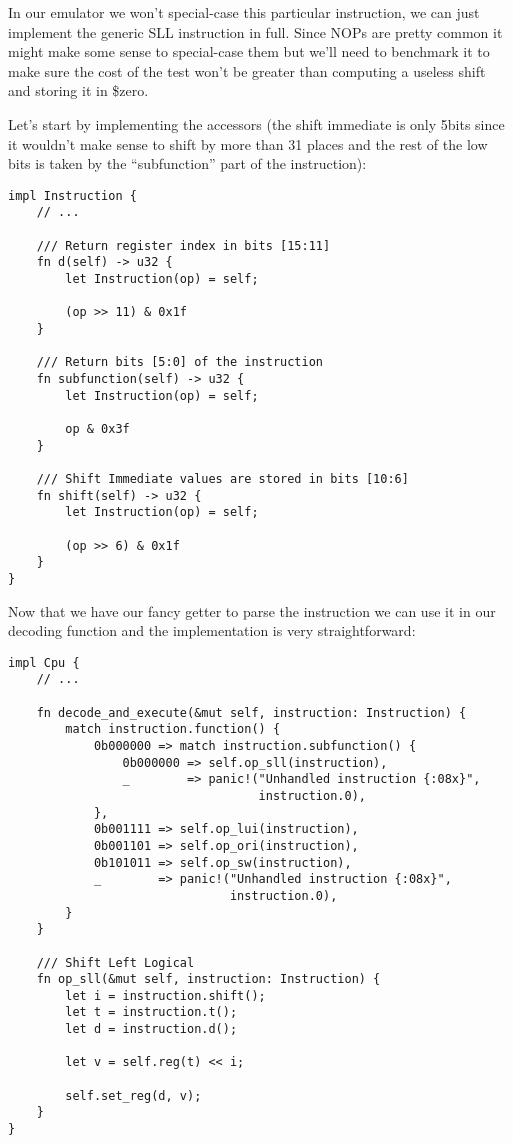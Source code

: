 \documentclass[a4paper]{article}
\begin{document}
In our emulator we won't special-case this particular instruction, we
can just implement the generic SLL instruction in full. Since NOPs are
pretty common it might make some sense to special-case them but we'll
need to benchmark it to make sure the cost of the test won't be
greater than computing a useless shift and storing it in \$zero.

Let's start by implementing the accessors (the shift immediate is only
5bits since it wouldn't make sense to shift by more than 31 places and
the rest of the low bits is taken by the ``subfunction'' part of the
instruction):

\begin{lstlisting}
impl Instruction {
    // ...

    /// Return register index in bits [15:11]
    fn d(self) -> u32 {
        let Instruction(op) = self;

        (op >> 11) & 0x1f
    }

    /// Return bits [5:0] of the instruction
    fn subfunction(self) -> u32 {
        let Instruction(op) = self;

        op & 0x3f
    }

    /// Shift Immediate values are stored in bits [10:6]
    fn shift(self) -> u32 {
        let Instruction(op) = self;

        (op >> 6) & 0x1f
    }
}
\end{lstlisting}

Now that we have our fancy getter to parse the instruction we can use it in
our decoding function and the implementation is very straightforward:

\begin{lstlisting}
impl Cpu {
    // ...

    fn decode_and_execute(&mut self, instruction: Instruction) {
        match instruction.function() {
            0b000000 => match instruction.subfunction() {
                0b000000 => self.op_sll(instruction),
                _        => panic!("Unhandled instruction {:08x}",
                                   instruction.0),
            },
            0b001111 => self.op_lui(instruction),
            0b001101 => self.op_ori(instruction),
            0b101011 => self.op_sw(instruction),
            _        => panic!("Unhandled instruction {:08x}",
                               instruction.0),
        }
    }

    /// Shift Left Logical
    fn op_sll(&mut self, instruction: Instruction) {
        let i = instruction.shift();
        let t = instruction.t();
        let d = instruction.d();

        let v = self.reg(t) << i;

        self.set_reg(d, v);
    }
}
\end{lstlisting}
\end{document}
